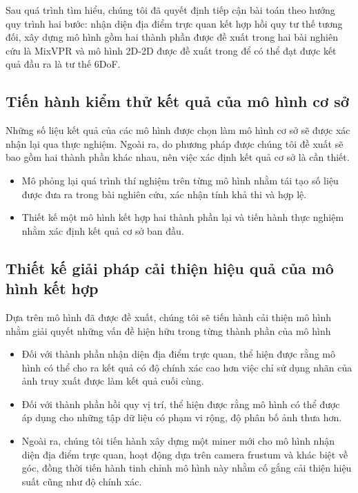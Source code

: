 Sau quá trình tìm hiểu, chúng tôi đã quyết định tiếp cận bài toán theo hướng quy trình hai bước: nhận diện địa điểm trực quan kết hợp hồi quy tư thế tương đối, xây dựng mô hình gồm hai thành phần được đề xuất trong hai bài nghiên cứu là MixVPR \cite{alibey2023mixvpr} và mô hình 2D-2D được đề xuất trong \cite{arnold2022mapfree} để có thể đạt được kết quả đầu ra là tư thế 6DoF.

\subsection{Tiến hành kiểm thử kết quả của mô hình cơ sở}
Những số liệu kết quả của các mô hình được chọn làm mô hình cơ sở sẽ được xác nhận lại qua thực nghiệm. Ngoài ra, do phương pháp được chúng tôi đề xuất sẽ bao gồm hai thành phần khác nhau, nên việc xác định kết quả cơ sở là cần thiết.
\begin{itemize}
    \item Mô phỏng lại quá trình thí nghiệm trên từng mô hình nhằm tái tạo số liệu được đưa ra trong bài nghiên cứu, xác nhận tính khả thi và hợp lệ.
    \item Thiết kế một mô hình kết hợp hai thành phần lại và tiến hành thực nghiệm nhằm xác định kết quả cơ sở ban đầu.
\end{itemize}

\subsection{Thiết kế giải pháp cải thiện hiệu quả của mô hình kết hợp}
Dựa trên mô hình đã được đề xuất, chúng tôi sẽ tiến hành cải thiện mô hình nhằm giải quyết những vấn đề hiện hữu trong từng thành phần của mô hình
\begin{itemize}
    \item Đối với thành phần nhận diện địa điểm trực quan, thể hiện được rằng mô hình có thể cho ra kết quả có độ chính xác cao hơn việc chỉ sử dụng nhãn của ảnh truy xuất được làm kết quả cuối cùng.
    \item Đối với thành phần hồi quy vị trí, thể hiện được rằng mô hình có thể được áp dụng cho những tập dữ liệu có phạm vi rộng, độ phân bố ảnh thưa hơn.
	\item Ngoài ra, chúng tôi tiến hành xây dựng một miner mới cho mô hình nhận diện địa điểm trực quan, hoạt động dựa trên camera frustum và khác biệt về góc, đồng thời tiến hành tinh chỉnh mô hình này nhằm cố gắng cải thiện hiệu suất cũng như độ chính xác.
\end{itemize}


